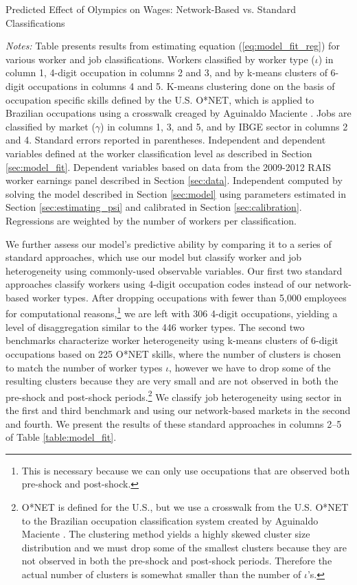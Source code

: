\documentclass[12pt]{article}
\def\g{\gamma}
\def\i{\iota}
\theoremstyle{definition}
\theoremstyle{plain}
\begin{document}
\begin{table}[h!] \centering
	\caption{Predicted Effect of Olympics on Wages: Network-Based vs. Standard Classifications}
	
	\label{table:model_fit}
	\flushleft\footnotesize \emph{Notes:} Table presents results from estimating equation (\ref{eq:model_fit_reg}) for various worker and job classifications. Workers classified by worker type ($\i$) in column 1, 4-digit occupation in columns 2 and 3, and by k-means clusters of 6-digit occupations in columns 4 and 5. K-means clustering done on the basis of occupation specific skills defined by the U.S. O*NET, which is applied to Brazilian occupations using a crosswalk creaged by Aguinaldo Maciente \citep{Maciente2013}. Jobs are classified by market ($\g$) in columns 1, 3, and 5, and by IBGE sector in columns 2 and 4. Standard errors reported in parentheses. Independent and dependent variables defined at the worker classification level as described in Section \ref{sec:model_fit}. Dependent variables based on data from the 2009-2012 RAIS worker earnings panel described in Section \ref{sec:data}. Independent computed by solving the model described in Section \ref{sec:model} using parameters estimated in Section \ref{sec:estimating_psi} and calibrated in Section \ref{sec:calibration}. Regressions are weighted by the number of workers per classification.
\end{table}




We further assess our model's predictive ability by comparing it to a series of standard approaches, which use our model but classify worker and job heterogeneity using commonly-used observable variables. Our first two standard approaches classify workers using 4-digit occupation codes instead of our network-based worker types. After dropping occupations with fewer than 5,000 employees for computational reasons,\footnote{This is necessary because we can only use occupations that are observed both pre-shock and post-shock. }  we are left with 306 4-digit occupations, yielding a level of disaggregation similar to the 446 worker types. The second two benchmarks characterize worker heterogeneity using k-means clusters of 6-digit occupations based on 225 O*NET skills, where the number of clusters is chosen to match the number of worker types $\i$, however we have to drop some of the resulting clusters because they are very small and are not observed in both the pre-shock and post-shock periods.\footnote{O*NET is defined for the U.S., but we use a crosswalk from the U.S. O*NET to the Brazilian occupation classification system created by Aguinaldo Maciente \citep{Maciente2013}. The clustering method yields a highly skewed cluster size distribution and we must drop some of the smallest clusters because they are not observed in both the pre-shock and post-shock periods. Therefore the actual number of clusters is somewhat smaller than the number of $\i$'s.} We classify job heterogeneity using sector in the first and third benchmark and using our network-based markets in the second and fourth. We present the results of these standard approaches in columns 2--5 of Table \ref{table:model_fit}.
\end{document}
